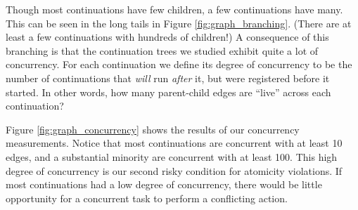\documentclass[acmsmall,anonymous,review]{acmart}\settopmatter{printfolios=true,printccs=false,printacmref=false}
\begin{document}
Though most continuations have few children, a few continuations have many.
This can be seen in the long tails in Figure \ref{fig:graph_branching}.
(There are at least a few continuations with hundreds of children!)
A consequence of this branching is that the continuation trees we studied exhibit quite a lot of concurrency.
For each continuation we define its degree of concurrency to be the number of continuations that \emph{will} run \emph{after} it, but were registered before it started.
In other words, how many parent-child edges are ``live'' across each continuation?

Figure \ref{fig:graph_concurrency} shows the results of our concurrency measurements.
Notice that most continuations are concurrent with at least 10 edges, and a substantial minority are concurrent with at least 100.
This high degree of concurrency is our second risky condition for atomicity violations.
If most continuations had a low degree of concurrency, there would be little opportunity for a concurrent task to perform a conflicting action.
\end{document}
